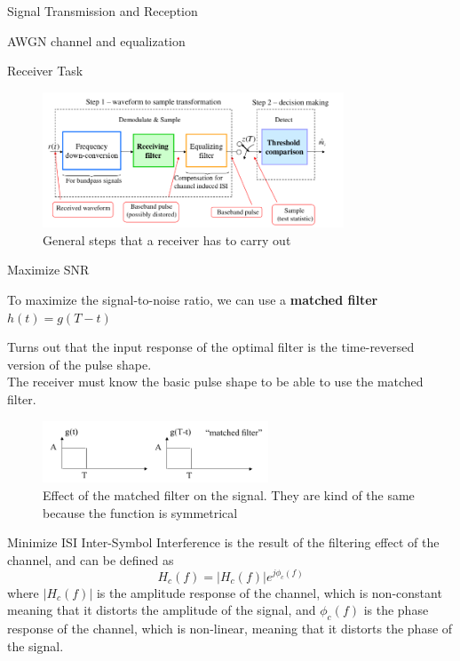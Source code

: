 \begin{section}{Signal Transmission and Reception}
\begin{subsection}{AWGN channel and equalization}
\begin{subsubsection}{Receiver Task}
      \begin{figure}[h]
        \centering
        \includegraphics[width=0.8\textwidth]{img/wireless/receiver steps.png}
        \caption{General steps that a receiver has to carry out}
        \label{fig:receiver task}
      \end{figure}
    \end{subsubsection}

    \begin{subsubsection}{Maximize SNR}
      \begin{boxH}
        To maximize the signal-to-noise ratio, we can use a \textbf{matched filter} $h(t)=g(T-t)$
      \end{boxH}
      Turns out that the input response of the optimal filter is the time-reversed version of the
      pulse shape.\\
      The receiver must know the basic pulse shape to be able to use the matched filter.\\
      \begin{figure}[h]
        \centering
        \includegraphics[width=0.6\textwidth]{img/wireless/matched filter.png}
        \caption{Effect of the matched filter on the signal. They are kind of the same because
        the function is symmetrical}
        \label{fig:matched filter}
      \end{figure}
    \end{subsubsection}

    \begin{subsubsection}{Minimize ISI}
      Inter-Symbol Interference is the result  of the filtering effect of the channel, and can be
      defined as 
      \begin{equation}
        H_c(f)=|H_c(f)|e^{j\phi_c(f)}
      \end{equation}
      where $|H_c(f)|$ is the amplitude response of the channel, which is non-constant meaning 
      that it distorts the amplitude of the signal, and $\phi_c(f)$ is the phase response of the
      channel, which is non-linear, meaning that it distorts the phase of the signal.\\


\end{subsubsection}
\end{subsection}
\end{section}
